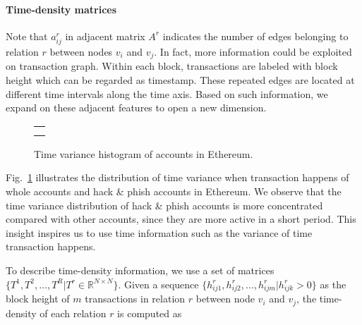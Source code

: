 

\paragraph{Time-density matrices}
Note that $a^r_{ij}$ in adjacent matrix $A^r$ indicates the number of edges belonging to relation $r$ between nodes $v_i$ and $v_j$.
In fact, more information could be exploited on transaction graph. Within each block, transactions are labeled with block height which can be regarded as timestamp. These repeated edges are located at different time intervals along the time axis. Based on such information, we expand on these adjacent features to open a new dimension.


\begin{figure}[htbp]
\centering
\begin{tabular}{c}
	\subfigure[Time variance histogram of whole nodes.]{
		\label{fig:high_order}
    
	}\\
	\subfigure[Time variance histogram of hack\&phish nodes.]{
		\label{fig:asymmetric}
    
	}
\end{tabular}
\caption{Time variance histogram of accounts in Ethereum.}
\label{fig:time_std}
\end{figure}

Fig.~\ref{fig:time_std} illustrates the distribution of time variance when transaction happens of whole accounts and hack \& phish accounts in Ethereum. We observe that the time variance distribution of hack \& phish accounts is more concentrated compared with other accounts, since they are more active in a short period. This insight inspires us to use time information such as the variance of time transaction happens.

To describe time-density information, we use a set of matrices $\{T^1,T^2,\dots,T^R|T^r\in \mathbb{R}^{N \times N}\}$. Given a sequence $\{h_{ij1}^r,h_{ij2}^r,\dots,h_{ijm}^r | h_{ijk}^r>0\}$ as the block height of $m$ transactions in relation $r$ between node $v_i$ and $v_j$, the time-density of each relation $r$ is computed as%

